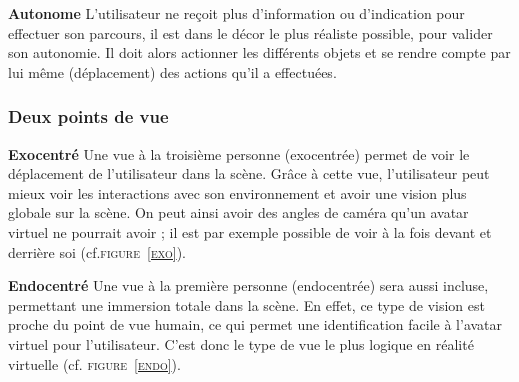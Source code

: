 \textbf{Autonome}
\newline
L'utilisateur ne reçoit plus d'information ou d'indication pour effectuer son parcours, il est dans le décor le plus réaliste possible, pour valider son autonomie. Il doit alors actionner les différents objets et se rendre compte par lui même (déplacement) des actions qu'il a effectuées.

\subsubsection{Deux points de vue}

\textbf{Exocentré}
\newline
Une vue à la troisième personne (exocentrée) permet de voir le déplacement de l'utilisateur dans la scène. Grâce à cette vue, l'utilisateur peut mieux voir les interactions avec son environnement et avoir une vision plus globale sur la scène. On peut ainsi avoir des angles de caméra qu'un avatar virtuel ne pourrait avoir ; il est par exemple possible de voir à la fois devant et derrière soi (cf.\textsc{figure~\ref{exo}}).

\textbf{Endocentré}
\newline
Une vue à la première personne (endocentrée) sera aussi incluse, permettant une immersion totale dans la scène. En effet, ce type de vision est proche du point de vue humain, ce qui permet une identification facile à l'avatar virtuel pour l'utilisateur. C'est donc le type de vue le plus logique en réalité virtuelle (cf. \textsc{figure~\ref{endo}}).

